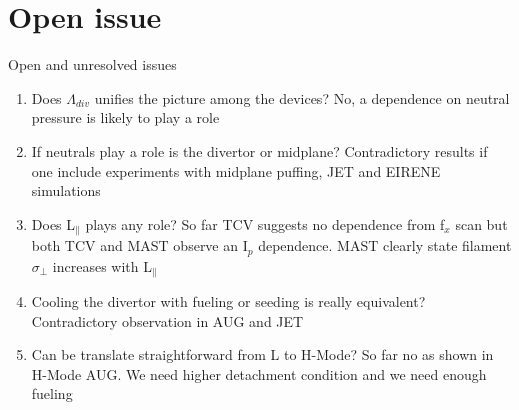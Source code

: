 \documentclass[10pt, compress]{beamer}
\begin{document}
  \section{Open issue}
  \begin{frame}{Open and unresolved issues}
  \begin{enumerate}[<+(1) | invisible@-+>]
    \item Does $\Lambda_{div}$ unifies the picture among the devices?
      \alert{No, a dependence on neutral pressure is likely to play a role}
    \item If neutrals play a role is the divertor or midplane?
      \alert{Contradictory results if one include experiments with
        midplane puffing, JET and EIRENE simulations}
    \item Does L$_\parallel$ plays any role? \alert{So far TCV suggests no
      dependence from f$_x$ scan but both TCV and MAST observe an
      I$_p$ dependence. MAST clearly state filament $\sigma_{\perp}$
      increases with L$_{\parallel}$ }
    \item Cooling the divertor with fueling or seeding is really
      equivalent? \alert{Contradictory observation in AUG and JET}
    \item Can be translate straightforward from L to H-Mode? \alert{So
      far no as shown in H-Mode AUG. We need higher detachment
      condition and we need enough fueling}
    \end{enumerate}

  \end{frame}
\end{document}
